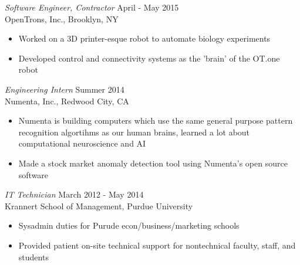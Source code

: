 \documentclass[margin,4pt]{res} %
\begin{document}
\begin{resume}
	{\sl Software Engineer, Contractor} \hfill April - May 2015\\
		OpenTrons, Inc., Brooklyn, NY
		\begin{itemize} \itemsep -2pt
		\item Worked on a 3D printer-esque robot to automate biology experiments
		\item Developed control and connectivity systems as the 'brain' of the OT.one robot
		\end{itemize}

	
	{\sl Engineering Intern} \hfill Summer 2014\\
          Numenta, Inc., Redwood City, CA
		\begin{itemize} \itemsep -2pt
	   	\item Numenta is building computers which use the same general purpose pattern recognition algortihms as our human brains, learned a lot about computational neuroscience and AI
		\item Made a stock market anomaly detection tool using Numenta's open source software
		\end{itemize}

	{\sl IT Technician} \hfill March 2012 - May 2014 \\
         	Krannert School of Management, Purdue University
		\begin{itemize} \itemsep -2pt
	      \item Sysadmin duties for Purude econ/business/marketing schools
           \item Provided patient on-site technical support for nontechnical faculty, staff, and students
		\end{itemize}


\end{resume}
\end{document}
